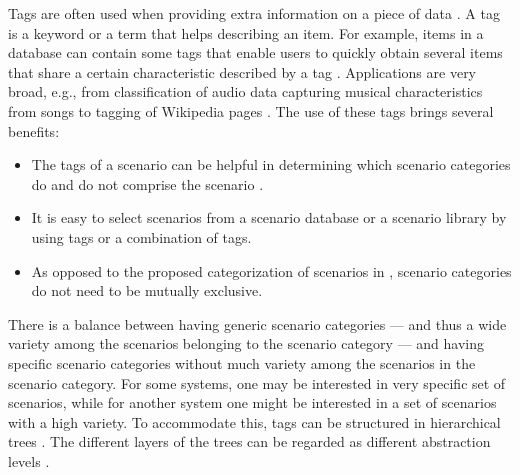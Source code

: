 Tags are often used when providing extra information on a piece of data \autocite{smith2007tagging}. A tag is a keyword or a term that helps describing an item. For example, items in a database can contain some tags that enable users to quickly obtain several items that share a certain characteristic described by a tag \autocite{craft2004tagging}. 
Applications are very broad, e.g., from classification of audio data \autocite{kong2017joint} capturing musical characteristics from songs \autocite{ellis2011semantic} to tagging of Wikipedia pages \autocite{voss2006collaborative}.
The use of these tags brings several benefits:
\begin{itemize}
	\item The tags of a scenario can be helpful in determining which scenario categories do and do not comprise the scenario \autocite{degelder2020scenariomining}.
	\item It is easy to select scenarios from a scenario database or a scenario library by using tags or a combination of tags.
	\item As opposed to the proposed categorization of scenarios in \autocite{opdencamp2014cats, USDoT2007precrashscenarios, lenard2014typical, lara2019harmonized, lara2019harmonized}, scenario categories do not need to be mutually exclusive.
\end{itemize}

There is a balance between having generic scenario categories --- and thus a wide variety among the scenarios belonging to the scenario category --- and having specific scenario categories without much variety among the scenarios in the scenario category. For some systems, one may be interested in very specific set of scenarios, while for another system one might be interested in a set of scenarios with a high variety. To accommodate this, tags can be structured in hierarchical trees \autocite{molloy2017dynamic}. The different layers of the trees can be regarded as different abstraction levels \autocite{Bonnin2014}. 





